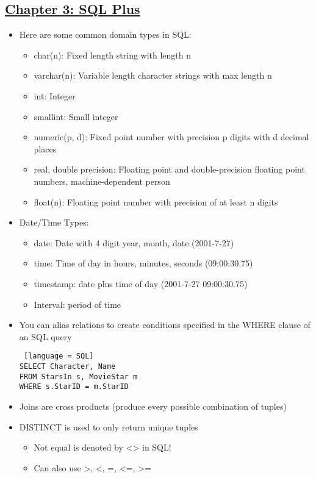 \documentclass[8pt,landscape,a4paper, fleqn, dvipsnames]{extarticle}
\begin{document}
\begin{multicols*}{4}
\section*{\ul{Chapter 3: SQL Plus}}
\begin{itemize}
    \item Here are some common domain types in SQL:
    \begin{itemize}
        \item char(n): Fixed length string with length n
        \item varchar(n): Variable length character strings with max length n
        \item int: Integer
        \item smallint: Small integer
        \item numeric(p, d): Fixed point number with precision p digits with d decimal places
        \item real, double precision: Floating point and double-precision floating point numbers, machine-dependent person
        \item float(n): Floating point number with precision of at least n digits
    \end{itemize}
    \item Date/Time Types:
    \begin{itemize}
        \item date: Date with 4 digit year, month, date (2001-7-27)
        \item time: Time of day in hours, minutes, seconds (09:00:30.75)
        \item timestamp: date plus time of day (2001-7-27 09:00:30.75)
        \item Interval: period of time
    \end{itemize}
    \item You can alias relations to create conditions specified in the WHERE clause of an SQL query
    \begin{lstlisting} [language = SQL]
SELECT Character, Name
FROM StarsIn s, MovieStar m
WHERE s.StarID = m.StarID
    \end{lstlisting}
    \item Joins are cross products (produce every possible combination of tuples)
    \item DISTINCT is used to only return unique tuples
    \begin{itemize}
        \item Not equal is denoted by <> in SQL!
        \item Can also use >, <, =, <=, >=

\end{itemize}
\end{itemize}
\end{multicols*}
\end{document}
